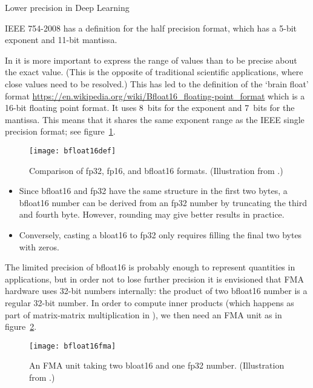  {Lower precision in Deep Learning}
\label{sec:arith-bfloat}

IEEE 754-2008 has a definition for the  half
precision format, which has a 5-bit exponent and 11-bit mantissa.

In  it is more important to express the range of values
than to be precise about the exact value. (This is the opposite of
traditional scientific applications, where close values need to be
resolved.)  This has led to the definition of the
 `brain float' format
\url{https://en.wikipedia.org/wiki/Bfloat16_floating-point_format}
which is a 16-bit
floating point format. It uses 8~bits for the exponent and 7~bits for
the mantissa. This means that it shares the same exponent range as the
IEEE single precision format; see figure~\ref{fig:bfloat16def}.

\begin{figure}[ht]
  \texttt{[image: bfloat16def]}  
  \caption{Comparison of fp32, fp16, and bfloat16
    formats. (Illustration from \cite{Intel:bfloat16}.)}
  \label{fig:bfloat16def}
\end{figure}

\begin{itemize}
\item Since bfloat16 and fp32 have the same structure in the first two bytes,
  a bfloat16 number can be derived from an fp32 number by
  truncating the third and fourth byte. However, rounding may give
  better results in practice.
\item Conversely, casting a bloat16 to fp32 only requires filling the
  final two bytes with zeros.
\end{itemize}

The limited precision of bfloat16 is probably enough to represent
quantities in  applications, but in order not to lose
further precision it is envisioned that \ac{FMA} hardware uses 32-bit
numbers internally: the product of two bfloat16 number is a regular
32-bit number. In order to compute inner products (which happens as
part of matrix-matrix multiplication in ), we then need an
\ac{FMA} unit as in figure~\ref{fig:bfloat16fma}.

\begin{figure}[ht]
  \texttt{[image: bfloat16fma]}
  \caption{An FMA unit taking two bloat16 and one fp32
    number. (Illustration from \cite{Intel:bfloat16}.)}
  \label{fig:bfloat16fma}
\end{figure}

